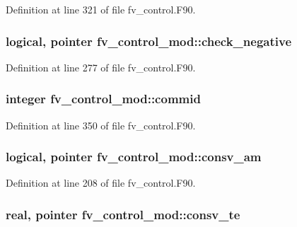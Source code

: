Definition at line 321 of file fv\-\_\-control.\-F90.

\subsubsection[{check\-\_\-negative}]{\setlength{\rightskip}{0pt plus 5cm}logical, pointer fv\-\_\-control\-\_\-mod\-::check\-\_\-negative\hspace{0.3cm}{\ttfamily [private]}}\label{classfv__control__mod_aa2e1b1eb3fdd42425c13c76b8d1fe939}


Definition at line 277 of file fv\-\_\-control.\-F90.

\subsubsection[{commid}]{\setlength{\rightskip}{0pt plus 5cm}integer fv\-\_\-control\-\_\-mod\-::commid\hspace{0.3cm}{\ttfamily [private]}}\label{classfv__control__mod_ab89d522e6d2e7e81dd9adc88477c54d6}


Definition at line 350 of file fv\-\_\-control.\-F90.

\subsubsection[{consv\-\_\-am}]{\setlength{\rightskip}{0pt plus 5cm}logical, pointer fv\-\_\-control\-\_\-mod\-::consv\-\_\-am\hspace{0.3cm}{\ttfamily [private]}}\label{classfv__control__mod_abe66b78f16d9db198fb246382e76dd2f}


Definition at line 208 of file fv\-\_\-control.\-F90.

\subsubsection[{consv\-\_\-te}]{\setlength{\rightskip}{0pt plus 5cm}real, pointer fv\-\_\-control\-\_\-mod\-::consv\-\_\-te\hspace{0.3cm}{\ttfamily [private]}}\label{classfv__control__mod_aea594e5fb2d344f493c621f7d89d8f69}


